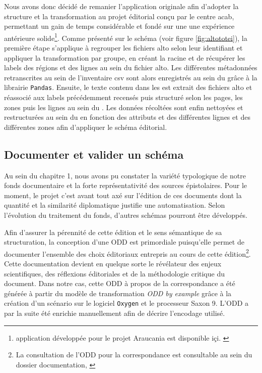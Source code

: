 	Nous avons donc décidé de remanier l'application originale afin d'adopter la structure et la transformation au projet éditorial conçu par le centre \gls{acab}, permettant un gain de temps considérable et fondé sur une une expérience antérieure solide\footnote{application développée pour le projet Araucania est disponible içi. \cite{humeauTeiTransformation2022}}. Comme présenté sur le schéma (voir figure \ref{fig:altototei}), la première étape s'applique à regrouper les fichiers \gls{alto} selon leur identifiant et appliquer la transformation par groupe, en créant la racine  et de récupérer les labels des régions et des lignes au sein du fichier \gls{alto}. Les différentes métadonnées retranscrites au sein de l'inventaire \gls{csv} sont alors enregistrés au sein du  grâce à la librairie \texttt{Pandas}. Ensuite, le texte contenu dans les  est extrait des fichiers \gls{alto} et réassocié aux labels précédemment recensés puis structuré selon les pages, les zones puis les lignes au sein du . Les données récoltées sont enfin nettoyées et restructurées au sein du  en fonction des attributs  et  des différentes lignes et des différentes zones afin d'appliquer le schéma éditorial.
	
	\subsection{Documenter et valider un schéma}
	
	Au sein du chapitre 1, nous avons pu constater la variété typologique de notre fonds documentaire et la forte représentativité des sources épistolaires. Pour le moment, le projet c'est avant tout axé sur l'édition de ces documents dont la quantité et la similarité diplomatique justifie une automatisation. Selon l'évolution du traitement du fonds, d'autres schémas pourront être développés.
	
	Afin d'assurer la pérennité de cette édition et le sens sémantique de sa structuration, la conception d'une \gls{ODD} est primordiale puisqu'elle permet de documenter l'ensemble des choix éditoriaux entrepris au cours de cette édition\footnote{La consultation de l'ODD pour la correspondance est consultable au sein du dossier documentation, \cite{humeauTeiTransformation2022}}. Cette documentation devient en quelque sorte le révélateur des enjeux scientifiques, des réflexions éditoriales et de la méthodologie critique du document. Dans notre cas, cette \gls{ODD} à propos de la correspondance a été générée à partir du modèle de transformation \textit{ODD by example} grâce à la création d'un scénario sur le logiciel \texttt{Oxygen} et le processeur Saxon 9. L'\gls{ODD} a par la suite été enrichie manuellement afin de décrire l'encodage utilisé.
	
